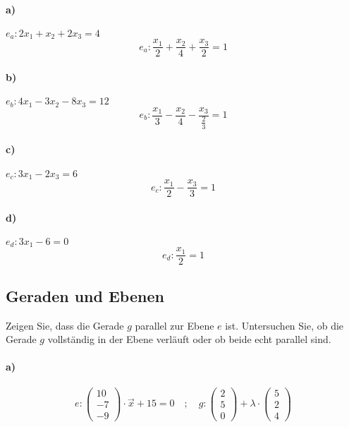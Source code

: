 \documentclass{ajc}
\numberwithin{equation}{subsection}
\begin{document}
	\paragraph{a)} $e_a: 2x_1 + x_2 + 2x_3 = 4$
	\begin{equation}
		e_a: \frac{x_1}{2} + \frac{x_2}{4} + \frac{x_3}{2} = 1
	\end{equation}
	
	\paragraph{b)} $e_b: 4x_1 - 3x_2 - 8x_3 = 12$
	\begin{equation}
		e_b: \frac{x_1}{3} - \frac{x_2}{4} - \frac{x_3}{\frac{2}{3}} = 1
	\end{equation}
	
	\paragraph{c)} $e_c: 3x_1 - 2x_3 = 6$
	\begin{equation}
		e_c: \frac{x_1}{2} - \frac{x_3}{3} = 1
	\end{equation}
	
	\paragraph{d)} $e_d: 3x_1 - 6 = 0$
	\begin{equation}
		e_d: \frac{x_1}{2} = 1
	\end{equation}
	
	\subsection{Geraden und Ebenen}
	Zeigen Sie, dass die Gerade $g$ parallel zur Ebene $e$ ist. Untersuchen Sie, ob die Gerade $g$ vollständig in der Ebene verläuft oder ob beide echt parallel sind.
	
	\paragraph{a)}
	\begin{equation}
		e: \left(\begin{array}{r} 10 \\ -7 \\ -9\end{array}\right) \cdot \vec{x} + 15 = 0 \quad ; \quad g: \left(\begin{array}{r} 2 \\ 5 \\ 0\end{array}\right) + \lambda \cdot \left(\begin{array}{r} 5 \\ 2 \\ 4\end{array}\right)
	\end{equation}
	
\end{document}
